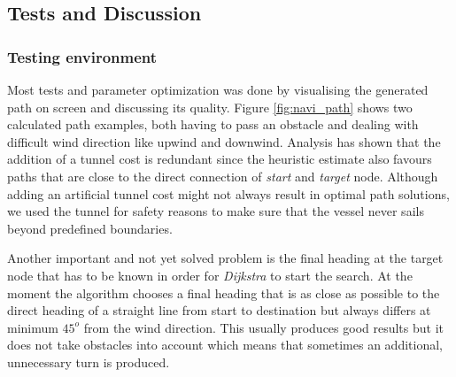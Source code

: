 \subsection{Tests and Discussion}
\subsubsection{Testing environment}
Most tests and parameter optimization was done by visualising the generated
path on screen and discussing its quality. Figure \ref{fig:navi_path}
shows two calculated path examples, both having to pass an obstacle and dealing
with difficult wind direction like upwind and downwind. Analysis has shown that the addition of a tunnel cost is redundant since the heuristic estimate also favours paths that are close to the direct connection of {\em start} and {\em target} node. Although adding an artificial tunnel cost might not always result in optimal path solutions, we used the tunnel for safety reasons to make sure that the vessel never sails beyond predefined boundaries. 

Another important and not yet solved problem is the final heading at the target
node that has to be known in order for \textit{Dijkstra} to start the search. At the
moment the algorithm chooses a final heading that is as close as possible to
the direct heading of a straight line from start to destination but always
differs at minimum $45^o$ from the wind direction. This usually produces good
results but it does not take obstacles into account which means that sometimes
an additional, unnecessary turn is produced. 

